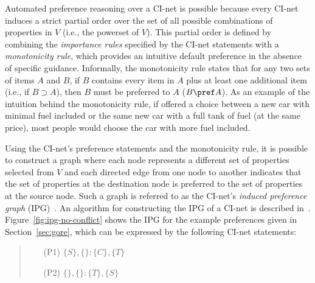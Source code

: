 Automated preference reasoning over a CI-net is possible because every
CI-net induces a strict partial order over the set of all possible
combinations of properties in $V$ (i.e., the powerset of $V$). 
This partial order is defined by combining the \emph{importance rules}
specified by the CI-net statements with a \emph{monotonicity rule}, 
which provides an intuitive default preference in the absence of
specific guidance. Informally, the monotonicity rule states that for
any two sets of items $A$ and $B$, if $B$ contains every item in $A$ 
plus at least one additional item (i.e., if $B \supset A$), then $B$ 
must be preferred to $A$ ($B \pref A$). As an example of the intuition
behind the monotonicity rule, if offered a choice between a new car
with minimal fuel included or the same new car with a full tank of
fuel (at the same price), most people would choose the car with more
fuel included. 
 
Using the CI-net's preference statements and the monotonicity rule, it
is possible to construct a graph where each node represents a different
set of properties selected from $V$ and each directed edge from one node
to another indicates that the set of properties at the destination node
is preferred to the set of properties at the source node. Such a graph
is referred to as the CI-net's \emph{induced preference graph} 
(IPG)~\cite{Bouveret:IJCAI2009}. An algorithm for constructing the
IPG of a CI-net is described in~\cite{Oster:FACS12}. 
Figure~\ref{fig:ipg-no-conflict} shows the IPG for the example 
preferences given in Section~\ref{sec:gore}, which can be expressed by
the following CI-net statements:
\begin{quote}
\begin{enumerate}
	\item[(P1)] $\{S\}, \{\} : \{C\}, \{T\}$
	\item[(P2)] $\{\}, \{\} : \{T\}, \{S\}$
\end{enumerate}
\end{quote}
%

